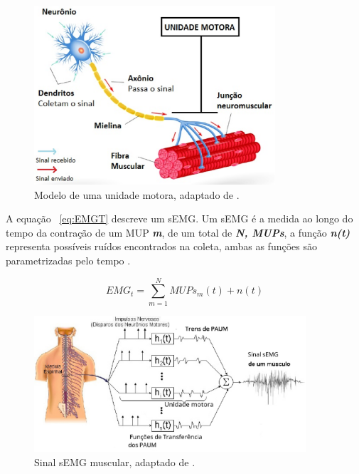 \begin{figure}[!htb]
   \centering
    \includegraphics[width=0.8\textwidth]{figuras/motor-neuron.eps}
    \caption{Modelo de uma unidade motora, adaptado de .}
    \label{UnidadeMotora}
\end{figure}

A equação ~\ref{eq:EMGT} descreve um sEMG. Um sEMG é a medida ao longo do tempo da contração de um MUP \textit{\textbf{m}}, de um total de \textit{\textbf{N, MUPs}}, a função \textit{\textbf{n(t)}} representa possíveis ruídos encontrados na coleta, ambas as funções são parametrizadas pelo tempo \cite{yousefi2014characterizing}.

\begin{equation} \label{eq:EMGT}
    EMG_{t} =\sum_{m=1}^{N} MUPs_{m}(t)+n(t)
\end{equation}

\begin{figure}[!htb]
    \centering
     \includegraphics[width=0.9\textwidth]{figuras/Representacao-esquematica-da-geracao-do-Sinal-Mioeletrico-de-um-musculo-a-partir-da.eps}
     \caption{Sinal sEMG muscular, adaptado de .}
     \label{PAUM}
 \end{figure}

